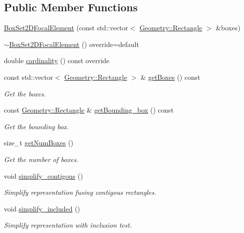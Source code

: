 \subsection*{Public Member Functions}
\begin{DoxyCompactItemize}
\item 
\hyperlink{classBoxSet2DFocalElement_a8215ede5350376e541893ce73d8e5a05}{Box\+Set2\+D\+Focal\+Element} (const std\+::vector$<$ \hyperlink{classGeometry_1_1Rectangle}{Geometry\+::\+Rectangle} $>$ \&boxes)
\item 
\hyperlink{classBoxSet2DFocalElement_aca7b4a88ffdd6b3d1e8b688c4f2e13ba}{$\sim$\+Box\+Set2\+D\+Focal\+Element} () override=default
\item 
double \hyperlink{classBoxSet2DFocalElement_a65dd4942ec406f9048432654f81df964}{cardinality} () const override
\item 
const std\+::vector$<$ \hyperlink{classGeometry_1_1Rectangle}{Geometry\+::\+Rectangle} $>$ \& \hyperlink{classBoxSet2DFocalElement_a21707f3b23e1d1b72db05ccfae023634}{get\+Boxes} () const 
\begin{DoxyCompactList}\small\item\em Get the boxes. \end{DoxyCompactList}\item 
const \hyperlink{classGeometry_1_1Rectangle}{Geometry\+::\+Rectangle} \& \hyperlink{classBoxSet2DFocalElement_a431361485288f14e2770aab9d12a1320}{get\+Bounding\+\_\+box} () const 
\begin{DoxyCompactList}\small\item\em Get the bounding box. \end{DoxyCompactList}\item 
size\+\_\+t \hyperlink{classBoxSet2DFocalElement_aea0ef3a8e8f6e64e1305400771590749}{get\+Num\+Boxes} ()
\begin{DoxyCompactList}\small\item\em Get the number of boxes. \end{DoxyCompactList}\item 
void \hyperlink{classBoxSet2DFocalElement_a48eaa6fae893da98034ea1359bb6a6da}{simplify\+\_\+contigous} ()
\begin{DoxyCompactList}\small\item\em Simplify representation fusing contigous rectangles. \end{DoxyCompactList}\item 
void \hyperlink{classBoxSet2DFocalElement_a8e80a0fb79597dfa97e7d2d4ef49623d}{simplify\+\_\+included} ()
\begin{DoxyCompactList}\small\item\em Simplify representation with inclusion test. \end{DoxyCompactList}\item 

\end{DoxyCompactItemize}
